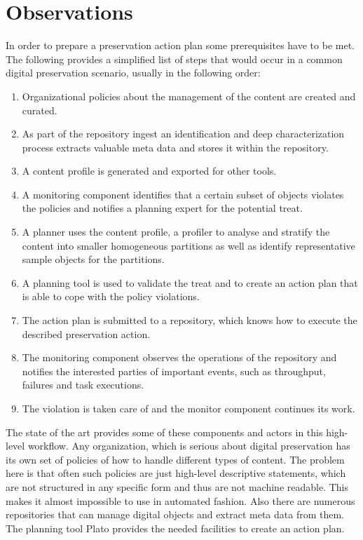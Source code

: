 \section{Observations}
In order to prepare a preservation action plan some prerequisites have to be met. The following provides a simplified list of steps that would occur in a common digital preservation scenario, usually in the following order: 
\begin{enumerate}
\item Organizational policies about the management of the content are created and curated.
\item As part of the repository ingest an identification and deep characterization process extracts valuable meta data and stores it within the repository.
\item A content profile is generated and exported for other tools.
\item A monitoring component identifies that a certain subset of objects violates the policies and notifies a planning expert for the potential treat.
\item A planner uses the content profile, a profiler to analyse and stratify the content into smaller homogeneous partitions as well as identify representative sample objects for the partitions.
\item A planning tool is used to validate the treat and to create an action plan that is able to cope with the policy violations.
\item The action plan is submitted to a repository, which knows how to execute the described preservation action.
\item The monitoring component observes the operations of the repository and notifies the interested parties of important events, such as throughput, failures and task executions. 
\item The violation is taken care of and the monitor component continues its work.
\end{enumerate}

The state of the art provides some of these components and actors in this high-level workflow. Any organization, which is serious about digital preservation has its own set of policies of how to handle different types of content. The problem here is that often such policies are just high-level descriptive statements, which are not structured in any specific form and thus are not machine readable. This makes it almost impossible to use in automated fashion. Also there are numerous repositories that can manage digital objects and extract meta data from them. The planning tool Plato provides the needed facilities to create an action plan.

